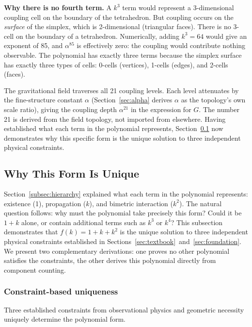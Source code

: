 \documentclass[aps,prd,preprint,superscriptaddress,showpacs,preprintnumbers,amsmath,amssymb,nofootinbib]{revtex4-2}
\begin{document}
\textbf{Why there is no fourth term.} A $k^3$ term would represent a 3-dimensional coupling cell on the boundary of the tetrahedron. But coupling occurs on the \emph{surface} of the simplex, which is 2-dimensional (triangular faces). There is no 3-cell on the boundary of a tetrahedron. Numerically, adding $k^3 = 64$ would give an exponent of 85, and $\alpha^{85}$ is effectively zero: the coupling would contribute nothing observable. The polynomial has exactly three terms because the simplex surface has exactly three types of cells: 0-cells (vertices), 1-cells (edges), and 2-cells (faces).

The gravitational field traverses all 21 coupling levels. Each level attenuates by the fine-structure constant $\alpha$ (Section~\ref{sec:alpha} derives $\alpha$ as the topology's own scale ratio), giving the coupling depth $\alpha^{21}$ in the expression for $G$. The number 21 is derived from the field topology, not imported from elsewhere. Having established what each term in the polynomial represents, Section~\ref{subsec:polynomial-uniqueness} now demonstrates why this specific form is the unique solution to three independent physical constraints.

\subsection{Why This Form Is Unique}
\label{subsec:polynomial-uniqueness}

Section~\ref{subsec:hierarchy} explained what each term in the polynomial represents: existence (1), propagation ($k$), and bimetric interaction ($k^2$). The natural question follows: why must the polynomial take precisely this form? Could it be $1 + k$ alone, or contain additional terms such as $k^3$ or $k^4$? This subsection demonstrates that $f(k) = 1 + k + k^2$ is the unique solution to three independent physical constraints established in Sections~\ref{sec:textbook}~and~\ref{sec:foundation}. We present two complementary derivations: one proves no other polynomial satisfies the constraints, the other derives this polynomial directly from component counting.

\subsubsection*{Constraint-based uniqueness}

Three established constraints from observational physics and geometric necessity uniquely determine the polynomial form.
\end{document}

